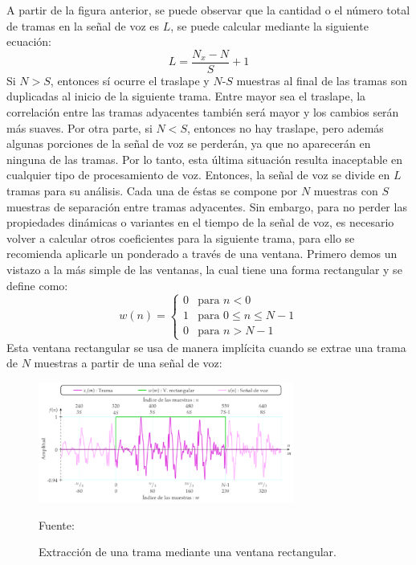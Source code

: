 \begin{enumerate}
A partir de la figura anterior, se puede observar que la cantidad o el número total de tramas en la señal de voz es $L$, se puede calcular mediante la siguiente ecuación:
\begin{equation}
\label{eq:ecuacion34}
L = \frac{N_{x} - N}{S} + 1
\end{equation}
Si $N>S$, entonces sí ocurre el traslape y $N \text{-} S$ muestras al final de las tramas son duplicadas al inicio de la siguiente trama. Entre mayor sea el traslape, la correlación entre las tramas adyacentes también será mayor y los cambios serán más suaves. Por otra parte, si $N < S$, entonces no hay traslape, pero además algunas porciones de la señal de voz se perderán, ya que no aparecerán en ninguna de las tramas. Por lo tanto, esta última situación resulta inaceptable en cualquier tipo de procesamiento de voz.
\vskip 0.5cm
Entonces, la señal de voz se divide en $L$ tramas para su análisis. Cada una de éstas se compone por $N$ muestras con $S$ muestras de separación entre tramas adyacentes. Sin embargo, para no perder las propiedades dinámicas o variantes en el tiempo de la señal de voz, es necesario volver a calcular otros coeficientes para la siguiente trama, para ello se recomienda aplicarle un ponderado a través de una ventana. Primero demos un vistazo a la más simple de las ventanas, la cual tiene una forma rectangular y se define como:
\begin{equation}
\label{eq:ecuacion35}
%
w(n) = 
\begin{cases}
0 & \text{para $n < 0$} \\ 
1 & \text{para $0 \leq  n \leq  N-1$} \\ 
0 & \text{para $n > N-1$} 
\end{cases}
%
\end{equation}
Esta ventana rectangular se usa de manera implícita cuando se extrae una trama de $N$ muestras a partir de una señal de voz:

\begin{figure}[ht]
\begin{center}
\includegraphics[width=0.75\textwidth]{Imagenes/Cap2/image035}
\end{center}
\begin{center}
\vskip -0.5cm
\caption{\small{Extracción de una trama mediante una ventana rectangular.}}
\label{fig:figura2.34}
{\small{Fuente: \cite{eyra}}}
\end{center}
\end{figure}


\end{enumerate}
